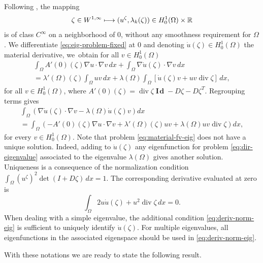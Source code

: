 \documentclass[11pt]{article}
\numberwithin{equation}{section}\newtheorem*{jepEnonce}{\jepEnonceTitle}\newenvironment{enonce*}[1]{\def\jepEnonceTitle{#1}\jepEnonce}{\endjepEnonce}\newtheorem*{conj*}{Conjecture}
\def\mto{\mathchoice{\longmapsto}{\mapsto}{\mapsto}{\mapsto}}
\theoremstyle{plain}
\theoremstyle{definition}
\newcommand{\di}{\operatorname{div}}
\newcommand{\bo}[1]{{\boldsymbol#1}}
\newcommand{\Id}{\operatorname{{\bo I\!\bo d}}}
\let\Bbb\mathbb
\begin{document}
Following \cite[Th.\,5.7.4 ]{henrot-pierre-english}, the mapping
\[
\zeta \in W^{1,\infty} \mto (u^\zeta, \lambda_k(\zeta)) \in H_0^1(\Omega)\times \Bbb{R}
\]
is of class $C^\infty$ on a neighborhood of $0$, without any smoothness requirement for $\Omega$. We differentiate \eqref{eq:eig-problem-fixed} at $0$ and denoting $\dot u(\zeta) \in H_0^1(\Omega)$ the material derivative, we~obtain for all $v \in H_0^1(\Omega)$
\vspace*{-5pt}
\begin{multline*}
\int_\Omega A'(0)(\zeta)\nabla u \cdot \nabla v \, dx +\int_\Omega \nabla \dot u(\zeta)\cdot \nabla v \, dx \\
= \lambda'(\Omega)(\zeta) \int_\Omega uv\, dx +\lambda(\Omega)\int_\Omega [\dot u(\zeta)v +uv\di \zeta]\, dx,
\end{multline*}
for all $v \in H_0^1(\Omega)$, where $A'(0)(\zeta) = \di \zeta \Id - D\zeta-D\zeta^T$. Regrouping terms gives
\vspace*{-5pt}
\begin{multline}
\int_\Omega \left(\nabla \dot u(\zeta)\cdot \nabla v -\lambda(\Omega) \dot u(\zeta)v\right)dx \\
= \int_\Omega\left(- A'(0)(\zeta)\nabla u \cdot \nabla v + \lambda'(\Omega)(\zeta) uv+\lambda(\Omega) uv\di \zeta\right) dx,
\label{eq:material-fv-eig}
\end{multline}
for every $v \in H_0^1(\Omega)$.
Note that problem \eqref{eq:material-fv-eig} does not have a unique solution. Indeed, adding to $\dot u(\zeta)$ any eigenfunction for problem \eqref{eq:dir-eigenvalue} associated to the eigenvalue $\lambda(\Omega)$ gives another solution. Uniqueness is a consequence of the normalization condition $\int_\Omega (u^\zeta)^2 \det(I+D\zeta)\, dx=1$. The corresponding derivative evaluated at zero is
\begin{equation}
\int_\Omega 2u\dot u(\zeta)+u^2 \di \zeta \, dx = 0.
\label{eq:deriv-norm-eig}
\end{equation}
When dealing with a simple eigenvalue, the additional condition \eqref{eq:deriv-norm-eig} is sufficient to uniquely identify $\dot u(\zeta)$. For multiple eigenvalues, all eigenfunctions in the associated eigenspace should be used in \eqref{eq:deriv-norm-eig}.

With these notations we are ready to state the following result.
\end{document}
